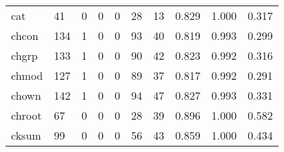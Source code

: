 \begin{longtable}{lp{2.0cm}p{2.0cm}p{2.0cm}p{2.0cm}p{2.0cm}p{2.0cm}p{2.0cm}p{2.0cm}p{2.0cm}}
cat       &                     41 &                                             0 &                                            0 &                                           0 &                                           28 &                                         13 &                                0.829 &                                  1.000 &                                0.317 \\
chcon     &                    134 &                                             1 &                                            0 &                                           0 &                                           93 &                                         40 &                                0.819 &                                  0.993 &                                0.299 \\
chgrp     &                    133 &                                             1 &                                            0 &                                           0 &                                           90 &                                         42 &                                0.823 &                                  0.992 &                                0.316 \\
chmod     &                    127 &                                             1 &                                            0 &                                           0 &                                           89 &                                         37 &                                0.817 &                                  0.992 &                                0.291 \\
chown     &                    142 &                                             1 &                                            0 &                                           0 &                                           94 &                                         47 &                                0.827 &                                  0.993 &                                0.331 \\
chroot    &                     67 &                                             0 &                                            0 &                                           0 &                                           28 &                                         39 &                                0.896 &                                  1.000 &                                0.582 \\
cksum     &                     99 &                                             0 &                                            0 &                                           0 &                                           56 &                                         43 &                                0.859 &                                  1.000 &                                0.434 \\

\end{longtable}
